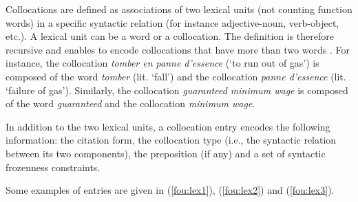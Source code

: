 \documentclass[output=paper]{langsci/langscibook}
\begin{document}

Collocations are defined as associations of two lexical units (not counting function words) in a specific syntactic relation (for instance adjective-noun, verb-object, etc.). 
A lexical unit can be a word or a collocation. The definition is therefore recursive and enables to encode collocations that have more than two words \citep{nws10}. 
For instance, the  collocation \textit{tomber en panne d’es\-sence} (`to run out of gas') is composed of the word \textit{tomber} (lit. `fall') and the collocation \textit{panne d'essence} (lit. `failure of gas'). Similarly, the  collocation 
\textit{guaranteed minimum wage} is composed of the word \textit{guaranteed} and the collocation \textit{minimum wage}.

In addition to the two lexical units, a collocation entry encodes the following information: 
the citation form, the collocation type (i.e., the syntactic relation between its two components), the preposition (if any) and a set of syntactic frozenness constraints. 

Some examples of  entries are given in (\ref{fou:lex1}), (\ref{fou:lex2}) and (\ref{fou:lex3}). %

\end{document}
